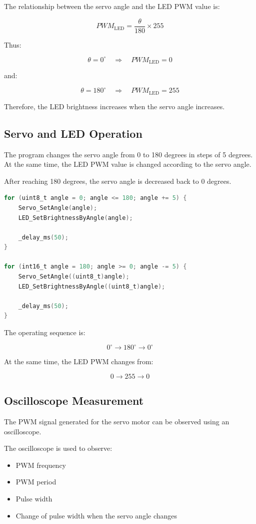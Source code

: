 \documentclass[12pt,a4paper]{article}
\begin{document}
The relationship between the servo angle and the LED PWM value is:

\[
PWM_{\mathrm{LED}}
=
\frac{\theta}{180}\times255
\]

Thus:

\[
\theta = 0^\circ
\quad\Rightarrow\quad
PWM_{\mathrm{LED}} = 0
\]

and:

\[
\theta = 180^\circ
\quad\Rightarrow\quad
PWM_{\mathrm{LED}} = 255
\]

Therefore, the LED brightness increases when the servo angle increases.

\subsection{Servo and LED Operation}

The program changes the servo angle from 0 to 180 degrees in steps of
5 degrees. At the same time, the LED PWM value is changed according to
the servo angle.

After reaching 180 degrees, the servo angle is decreased back to
0 degrees.

\begin{lstlisting}[language=C]
for (uint8_t angle = 0; angle <= 180; angle += 5) {
    Servo_SetAngle(angle);
    LED_SetBrightnessByAngle(angle);

    _delay_ms(50);
}

for (int16_t angle = 180; angle >= 0; angle -= 5) {
    Servo_SetAngle((uint8_t)angle);
    LED_SetBrightnessByAngle((uint8_t)angle);

    _delay_ms(50);
}
\end{lstlisting}

The operating sequence is:

\[
0^\circ
\rightarrow
180^\circ
\rightarrow
0^\circ
\]

At the same time, the LED PWM changes from:

\[
0
\rightarrow
255
\rightarrow
0
\]

\subsection{Oscilloscope Measurement}

The PWM signal generated for the servo motor can be observed using an
oscilloscope.

The oscilloscope is used to observe:

\begin{itemize}
    \item PWM frequency
    \item PWM period
    \item Pulse width
    \item Change of pulse width when the servo angle changes
\end{itemize}
\end{document}
